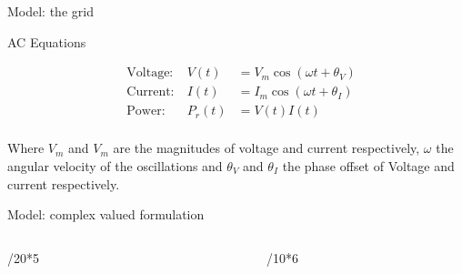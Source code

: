 \documentclass[final]{beamer}
\newlength{\colwidth}
\begin{document}
\begin{frame}[t]
\begin{columns}[t]
\begin{column}{\colwidth}
\begin{block}{Model: the grid}
  \end{block}

  \begin{alertblock}{AC Equations}

    \begin{equation}
      \begin{aligned}
          &\text{Voltage:}& \ V(t) &= V_m \cos(\omega t + \theta_V) \\
          &\text{Current:}& \ I(t) &= I_m \cos(\omega t + \theta_I) \\
          &\text{Power:}  & \ P_r(t) &= V(t)I(t)\\
      \end{aligned}
    \end{equation}

    Where $V_m$ and $V_m$ are the magnitudes of voltage and current respectively,
    $\omega$ the angular velocity of the oscillations and $\theta_V$ and $\theta_I$
    the phase offset of Voltage and current respectively.

  \end{alertblock}

  \begin{alertblock}{Model: complex valued formulation}
    \begin{columns}[t]
      
      \begin{column}{\colwidth/20*5}

        \begin{figure}
          \centering
        \end{figure}

      \end{column}

      \begin{column}{\colwidth/10*6}


\end{column}
\end{columns}
\end{alertblock}
\end{column}
\end{columns}
\end{frame}
\end{document}
